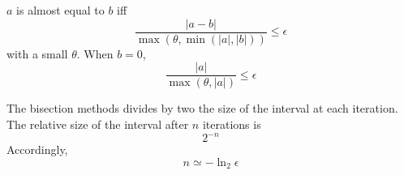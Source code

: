 \documentclass[aps,12pt]{revtex4}
\begin{document}
$a$ is almost equal to $b$ iff
\begin{equation}
	\dfrac{\vert a - b \vert}{ \max(\theta,\min(\vert a \vert,\vert b \vert)) } \leq \epsilon
\end{equation}
with a small $\theta$.
When $b=0$, 
\begin{equation}
	\dfrac{\vert a \vert }{ \max(\theta,\vert a \vert) } \leq \epsilon
\end{equation}

The bisection methods divides by two the size of the interval at each iteration.
The relative size of the interval after $n$ iterations is
$$
	 2^{-n}
$$
Accordingly, 
$$
	n \simeq -\ln_2 \epsilon
$$
\end{document}
